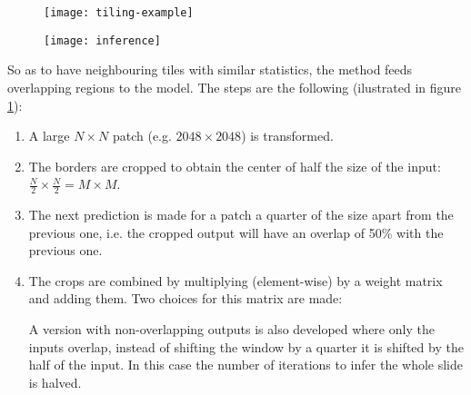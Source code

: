 \documentclass[../main.tex]{subfiles}
\begin{document}
\begin{figure}[b]
\centering
\begin{minipage}{.5\textwidth}
\centering
\texttt{[image: tiling-example]}
\label{fig:tiling-example}
\end{minipage}%
\begin{minipage}{.5\textwidth}
\centering
\texttt{[image: inference]}
\label{fig:inference}
\end{minipage}
\end{figure}

So as to have neighbouring tiles with similar statistics,
the method feeds overlapping regions to the model.
The steps are the following (ilustrated in figure \ref{fig:inference}):
\begin{enumerate}

\item A large $N \times N$ patch (e.g. $2048 \times 2048$) is transformed.

\item The borders are cropped to obtain the center of half the size of the input:
$\frac{N}{2} \times \frac{N}{2} = M \times M$.

\item The next prediction is made for a patch a quarter of the size apart from
      the previous one, i.e. the cropped output will have an overlap of 50\%
      with the previous one.

\item The crops are combined by multiplying (element-wise) by a weight matrix
      and adding them.  Two choices for this matrix are made:

A version with non-overlapping outputs is also developed where only the inputs
overlap, instead of shifting the window by a quarter it is shifted by the half of
the input. In this case the number of iterations to infer the whole slide is
halved.
\end{enumerate}
\end{document}
